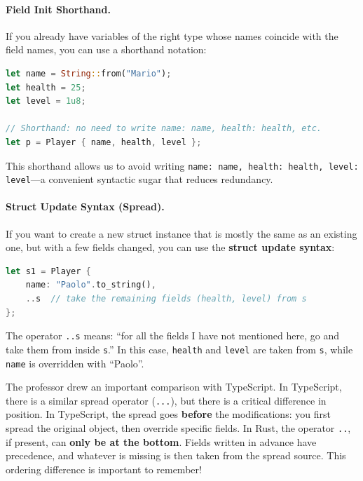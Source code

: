 \paragraph{Field Init Shorthand.} If you already have variables of the right type whose names coincide with the field names, you can use a shorthand notation:

\begin{lstlisting}[language=Rust]
let name = String::from("Mario");
let health = 25;
let level = 1u8;

// Shorthand: no need to write name: name, health: health, etc.
let p = Player { name, health, level };
\end{lstlisting}

This shorthand allows us to avoid writing \texttt{name: name, health: health, level: level}---a convenient syntactic sugar that reduces redundancy.

\paragraph{Struct Update Syntax (Spread).} If you want to create a new struct instance that is mostly the same as an existing one, but with a few fields changed, you can use the \textbf{struct update syntax}:

\begin{lstlisting}[language=Rust]
let s1 = Player {
    name: "Paolo".to_string(),
    ..s  // take the remaining fields (health, level) from s
};
\end{lstlisting}

The operator \texttt{..s} means: ``for all the fields I have not mentioned here, go and take them from inside \texttt{s}.'' In this case, \texttt{health} and \texttt{level} are taken from \texttt{s}, while \texttt{name} is overridden with ``Paolo''.

\begin{insightbox}
The professor drew an important comparison with TypeScript. In TypeScript, there is a similar spread operator (\texttt{...}), but there is a critical difference in position. In TypeScript, the spread goes \textbf{before} the modifications: you first spread the original object, then override specific fields. In Rust, the operator \texttt{..}, if present, can \textbf{only be at the bottom}. Fields written in advance have precedence, and whatever is missing is then taken from the spread source. This ordering difference is important to remember!
\end{insightbox}

